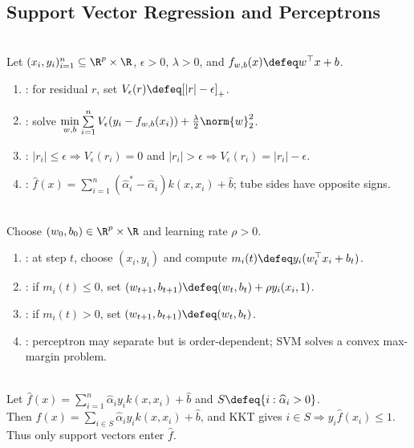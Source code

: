 \subsection{Support Vector Regression and Perceptrons}
\begin{method} \label{meth:sl-epsilon-insensitive-support-vector-regression} \\
Let $(x_i,y_i)_{i=1}^n\subseteq\R^p\times\R$, $\epsilon>0$, $\lambda>0$, and $f_{w,b}(x)\defeq w^\top x+b$.
\begin{enumerate}[label=(\roman*)]
\setlength{\itemsep}{0pt}
\item {}: for residual $r$, set $V_\epsilon(r)\defeq[|r|-\epsilon]_+$.
\item {}: solve $\min\limits_{w,b}\sum\limits_{i=1}^n V_\epsilon(y_i-f_{w,b}(x_i))+\frac{\lambda}{2}\norm{w}_2^2$.
\item {}: $|r_i|\leq\epsilon\Rightarrow V_\epsilon(r_i)=0$ and $|r_i|>\epsilon\Rightarrow V_\epsilon(r_i)=|r_i|-\epsilon$.
\item {}: $\widehat{f}(x)=\sum\limits_{i=1}^n(\widehat{\alpha}_i^*-\widehat{\alpha}_i)k(x,x_i)+\widehat{b}$; tube sides have opposite signs.
\end{enumerate}
\end{method}

\begin{method} \label{meth:sl-perceptron-update} \\
Choose $(w_0,b_0)\in\R^p\times\R$ and learning rate $\rho>0$.
\begin{enumerate}[label=(\roman*)]
\setlength{\itemsep}{0pt}
\item {}: at step $t$, choose $(x_i,y_i)$ and compute $m_i(t)\defeq y_i(w_t^\top x_i+b_t)$.
\item {}: if $m_i(t)\leq0$, set $(w_{t+1},b_{t+1})\defeq(w_t,b_t)+\rho y_i(x_i,1)$.
\item {}: if $m_i(t)>0$, set $(w_{t+1},b_{t+1})\defeq(w_t,b_t)$.
\item {}: perceptron may separate but is order-dependent; SVM solves a convex max-margin problem.
\end{enumerate}
\end{method}

\begin{remark} \label{rem:sl-support-vectors} \\
Let $\widehat{f}(x)=\sum\limits_{i=1}^n\widehat{\alpha}_iy_ik(x,x_i)+\widehat{b}$ and $S\defeq\{i:\widehat{\alpha}_i>0\}$.\\
Then $\widehat{f}(x)=\sum\limits_{i\in S}\widehat{\alpha}_iy_ik(x,x_i)+\widehat{b}$, and KKT gives $i\in S\Rightarrow y_i\widehat{f}(x_i)\leq1$. Thus only support vectors enter $\widehat{f}$.
\end{remark}

